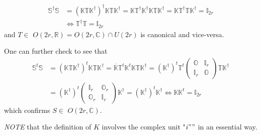 \documentclass[aps, preprint]{revtex4}
\begin{document}
\begin{align}\mathbb{S}^{ \dag } \mathbb{S} &  =\left (\mathbb{K} \mathbb{T} \mathbb{K}^{ \dag }\right )^{ \dag } \mathbb{K} \mathbb{T} \mathbb{K}^{ \dag } =\mathbb{K} \mathbb{T}^{ \dag } \mathbb{K}^{ \dag } \mathbb{K} \mathbb{T} \mathbb{K}^{ \dag } =\mathbb{K} \mathbb{T}^{ \dag } \mathbb{T} \mathbb{K}^{ \dag } =\mathbb{I}_{2 r} \nonumber  \\
 &  \Leftrightarrow \mathbb{T}^{ \dag } \mathbb{T} =\mathbb{I}_{2 r}\end{align}and $T \in $ $O \left (2 r ,\mathbb{R}\right ) =O \left (2 r ,\mathbb{C}\right ) \cap U \left (2 r\right )$ is canonical and vice-versa. 

One can further check to see that
\begin{align}\mathbb{S}^{t} \mathbb{S} &  =\left (\mathbb{K} \mathbb{T} \mathbb{K}^{ \dag }\right )^{t} \mathbb{K} \mathbb{T} \mathbb{K}^{ \dag } =\overline{\mathbb{K}} \mathbb{T}^{t} \mathbb{K}^{t} \mathbb{K} \mathbb{T} \mathbb{K}^{ \dag } =\left (\mathbb{K}^{ \dag }\right )^{t} \mathbb{T}^{t} \left (\begin{array}{cc}\mathbb{O} & \mathbb{I}_{r} \\
\mathbb{I}_{r} & \mathbb{O}\end{array}\right ) \mathbb{T} \mathbb{K}^{ \dag } \nonumber  \\
 &  =\left (\mathbb{K}^{ \dag }\right )^{t} \left (\begin{array}{cc}\mathbb{I}_{r} & \mathbb{O}_{r} \\
\mathbb{O}_{r} & \mathbb{I}_{r}\end{array}\right ) \mathbb{K}^{ \dag } =\left (\mathbb{K}^{ \dag }\right )^{t} \mathbb{K}^{ \dag } \Longleftrightarrow \mathbb{K} \mathbb{K}^{t} =\mathbb{I}_{2 r}\end{align}which confirms $S \in $ $O \left (2 r ,\mathbb{C}\right )\text{.}$ 

\emph{NOTE} that the definition of $K$ involves the complex unit "$i ""$ in an essential way. 
\end{document}
